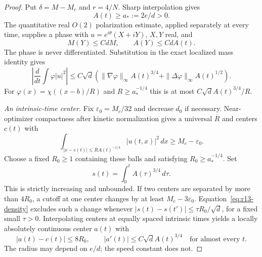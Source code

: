 \begin{proof}
Put $\delta=M-M_c$ and $r=4/N$. Sharp interpolation gives
\begin{equation}\label{eq:r13-min-A}
 A(t)\ge a_*:=2e/d>0.
\end{equation}
The quantitative real $O(2)$ polarization estimate, applied separately
at every time, supplies a phase with $u=e^{i\theta}(X+iY)$, $X,Y$ real,
and
\[
 M(Y)\le CdM,\qquad A(Y)\le CdA(t).
\]
The phase is never differentiated. Substitution in the exact localized
mass identity gives
\begin{equation}\label{eq:r13-density}
 \left|\frac d{dt}\int\varphi|u|^2\right|
 \le C\sqrt d\left(
 \|\nabla\varphi\|_\infty A(t)^{3/4}
 +\|\Delta\varphi\|_\infty A(t)^{1/2}\right).
\end{equation}
For $\varphi(x)=\chi((x-b)/R)$ and $R\ge a_*^{-1/4}$ this is at most
$C\sqrt d A(t)^{3/4}/R$.

\medskip\noindent\emph{An intrinsic-time center.}
Fix $\varepsilon_0=M_c/32$ and decrease $d_0$ if necessary.
Near-optimizer compactness after kinetic normalization gives a universal
$\overline R$ and centers $c(t)$ with
\begin{equation}\label{eq:r13-center-core}
 \int_{|x-c(t)|\le\overline R A(t)^{-1/4}}|u(t,x)|^2\,dx
 \ge M_c-\varepsilon_0.
\end{equation}
Choose a fixed $R_0\ge1$ containing these balls and satisfying
$R_0\ge a_*^{-1/4}$. Set
\[
 s(t)=\int_0^t A(\tau)^{3/4}\,d\tau.
\]
This is strictly increasing and unbounded. If two centers are separated
by more than $4R_0$, a cutoff at one center changes by at least
$M_c-3\varepsilon_0$. Equation~\eqref{eq:r13-density} excludes such a
change whenever $|s(t)-s(t')|\le\tau R_0/\sqrt d$, for a fixed small
$\tau>0$. Interpolating centers at equally spaced intrinsic times yields
a locally absolutely continuous center $a(t)$ with
\begin{equation}\label{eq:r13-center-speed}
 |a(t)-c(t)|\le8R_0,
 \qquad |a'(t)|\le C\sqrt d A(t)^{3/4}
 \quad\text{for almost every }t.
\end{equation}
The radius may depend on $e/d$; the speed constant does not.


\end{proof}
